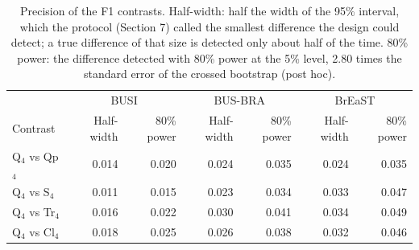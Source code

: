 \begin{table}[!ht]
\centering
\caption{Precision of the F1 contrasts. Half-width: half the width of the 95\% interval, which the protocol (Section 7) called the smallest difference the design could detect; a true difference of that size is detected only about half of the time. 80\% power: the difference detected with 80\% power at the 5\% level, 2.80 times the standard error of the crossed bootstrap (post hoc).}\label{stab:mdd}
\footnotesize
\begin{tabular}{@{}lrrrrrr@{}}
\toprule
 & \multicolumn{2}{c}{BUSI} & \multicolumn{2}{c}{BUS-BRA} & \multicolumn{2}{c}{BrEaST} \\
Contrast & Half-width & 80\% power & Half-width & 80\% power & Half-width & 80\% power \\
\midrule
Q$_4$ vs Qp$_4$ & 0.014 & 0.020 & 0.024 & 0.035 & 0.024 & 0.035 \\
Q$_4$ vs S$_4$ & 0.011 & 0.015 & 0.023 & 0.034 & 0.033 & 0.047 \\
Q$_4$ vs Tr$_4$ & 0.016 & 0.022 & 0.030 & 0.041 & 0.034 & 0.049 \\
Q$_4$ vs Cl$_4$ & 0.018 & 0.025 & 0.026 & 0.038 & 0.032 & 0.046 \\
\bottomrule
\end{tabular}
\end{table}

